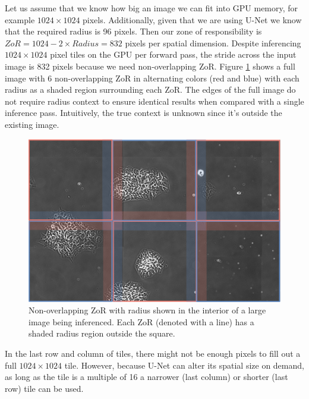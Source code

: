 \documentclass[letterpaper]{article} %
\begin{document}
Let us assume that we know how big an image we can fit into GPU memory, for example $1024 \times 1024$ pixels. Additionally, given that we are using U-Net we know that the required radius is 96 pixels. Then our zone of responsibility is $ZoR = 1024 - 2 \times Radius = 832$ pixels per spatial dimension. 
Despite inferencing $1024 \times 1024$ pixel tiles on the GPU per forward pass, the stride across the input image is 832 pixels because we need non-overlapping ZoR. Figure \ref{fig:all-zor} shows a full image with 6 non-overlapping ZoR in alternating colors (red and blue) with each radius as a shaded region surrounding each ZoR. The edges of the full image do not require radius context to ensure identical results when compared with a single inference pass. Intuitively, the true context is unknown since it's outside the existing image.

\begin{figure}[h!]
	\centering
		\includegraphics[width=\linewidth]{figs/all_zor.png}
	\caption{Non-overlapping ZoR with radius shown in the interior of a large image being inferenced. Each ZoR (denoted with a line) has a shaded radius region outside the square. }
	\label{fig:all-zor}
\end{figure}

In the last row and column of tiles, there might not be enough pixels to fill out a full $1024 \times 1024$ tile. However, because U-Net can alter its spatial size on demand, as long as the tile is a multiple of 16 a narrower (last column) or shorter (last row) tile can be used. 
\end{document}
